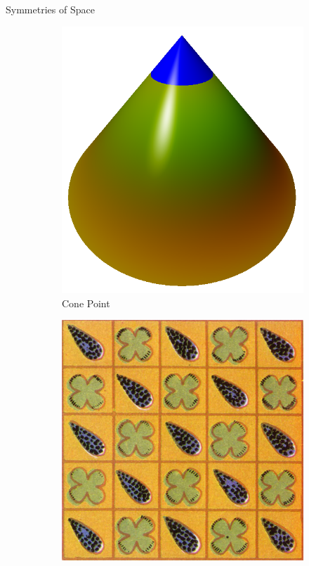 \documentclass[final]{beamer}
\newlength{\onecolwid}
\begin{document}
\begin{frame}[t]
\begin{columns}[t]
\begin{column}{\onecolwid}
\begin{block}{Symmetries of Space}
\begin{figure}[c]
\begin{subfigure}[c]{0.2\textwidth}
            \includegraphics[width=\textwidth]{images/cone_point.png}
            \caption{Cone Point}
        \end{subfigure}
        \begin{subfigure}[c]{0.25\textwidth}
        \includegraphics[width=\textwidth]{images/reflection_symmetry_wallpaper.jpg}

\end{subfigure}
\end{figure}
\end{block}
\end{column}
\end{columns}
\end{frame}
\end{document}
